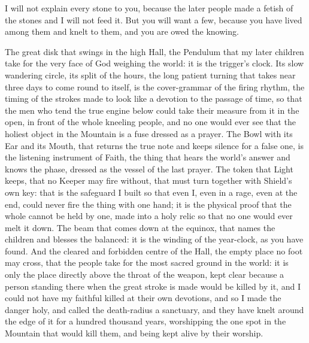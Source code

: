 \ornament

I will not explain every stone to you, because the later people made a fetish of the stones and I will not feed it. But you will want a few, because you have lived among them and knelt to them, and you are owed the knowing.\par

The great disk that swings in the high Hall, the Pendulum that my later children take for the very face of God weighing the world: it is the trigger's clock. Its slow wandering circle, its split of the hours, the long patient turning that takes near three days to come round to itself, is the cover-grammar of the firing rhythm, the timing of the strokes made to look like a devotion to the passage of time, so that the men who tend the true engine below could take their measure from it in the open, in front of the whole kneeling people, and no one would ever see that the holiest object in the Mountain is a fuse dressed as a prayer. The Bowl with its Ear and its Mouth, that returns the true note and keeps silence for a false one, is the listening instrument of Faith, the thing that hears the world's answer and knows the phase, dressed as the vessel of the last prayer. The token that Light keeps, that no Keeper may fire without, that must turn together with Shield's own key: that is the safeguard I built so that even I, even in a rage, even at the end, could never fire the thing with one hand; it is the physical proof that the whole cannot be held by one, made into a holy relic so that no one would ever melt it down. The beam that comes down at the equinox, that names the children and blesses the balanced: it is the winding of the year-clock, as you have found. And the cleared and forbidden centre of the Hall, the empty place no foot may cross, that the people take for the most sacred ground in the world: it is only the place directly above the throat of the weapon, kept clear because a person standing there when the great stroke is made would be killed by it, and I could not have my faithful killed at their own devotions, and so I made the danger holy, and called the death-radius a sanctuary, and they have knelt around the edge of it for a hundred thousand years, worshipping the one spot in the Mountain that would kill them, and being kept alive by their worship.\par

